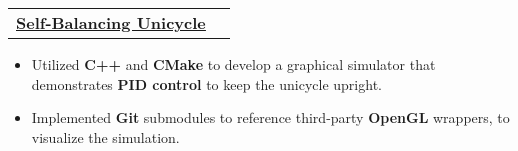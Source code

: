 \documentclass[letterpaper]{article}
\makeatletter
\newcommand{\resumeItem}[1]{
  \item\small{
    {#1 \vspace{-2pt}}
  }
}
\newcommand{\resumeProjectHeading}[2]{
    \item
    \begin{tabular*}{0.97\textwidth}{l@{\extracolsep{\fill}}r}
      \small#1 & #2 \\
    \end{tabular*}\vspace{-7pt}
}
\newcommand{\resumeProjectHeadingWithDetails}[4]{
    \item
    \begin{tabular*}{0.97\textwidth}{l@{\extracolsep{\fill}}r}
      \small#1 & #2 \\[5pt] %
      \textit{\small#3} & \textit{\small #4} \\
    \end{tabular*}\vspace{-7pt}
}
\newcommand{\resumeItemListStart}{\begin{itemize}}
\newcommand{\resumeItemListEnd}{\end{itemize}\vspace{-5pt}}
\makeatother
\begin{document}
\resumeProjectHeading
{\textbf{\href{https://github.com/gavintranquilino/self-balancing-unicycle}{\underline{Self-Balancing Unicycle}}} }{}
\resumeItemListStart
\resumeItem{Utilized \textbf{C++} and \textbf{CMake} to develop a graphical simulator that demonstrates \textbf{PID control} to keep the unicycle upright.}
\resumeItem{Implemented \textbf{Git} submodules to reference third-party \textbf{OpenGL} wrappers, to visualize the simulation.}
\resumeItemListEnd




\end{document}

